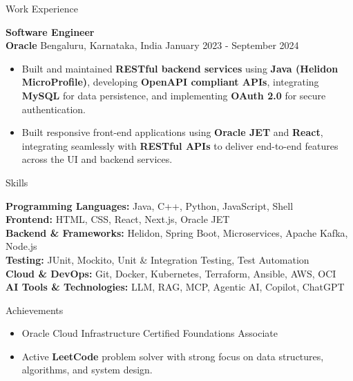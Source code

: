 \documentclass{resume}
\begin{document}
\begin{rSection}{Work Experience}
\vspace{6pt}

\textbf{Software Engineer} \\
\textbf{Oracle} \textbar{} Bengaluru, Karnataka, India \hspace*{\fill} January 2023 - September 2024
\vspace{-2pt}
\begin{itemize}
    \item Built and maintained \textbf{RESTful backend services} using \textbf{Java (Helidon MicroProfile)}, developing \textbf{OpenAPI compliant APIs}, integrating \textbf{MySQL} for data persistence, and implementing \textbf{OAuth 2.0} for secure authentication.
    \item Built responsive front-end applications using \textbf{Oracle JET} and \textbf{React}, integrating seamlessly with \textbf{RESTful APIs} to deliver end-to-end features across the UI and backend services.
\end{itemize}

\end{rSection}

\begin{rSection}{Skills}

\vspace{-2pt}
\textbf{Programming Languages:} Java, C++, Python, JavaScript, Shell \\
\textbf{Frontend:} HTML, CSS, React, Next.js, Oracle JET \\
\textbf{Backend \& Frameworks:} Helidon, Spring Boot, Microservices, Apache Kafka, Node.js \\
\textbf{Testing:} JUnit, Mockito, Unit \& Integration Testing, Test Automation \\
\textbf{Cloud \& DevOps:} Git, Docker, Kubernetes, Terraform, Ansible, AWS, OCI \\
\textbf{AI Tools \& Technologies:} LLM, RAG, MCP, Agentic AI, Copilot, ChatGPT

\end{rSection}

\begin{rSection}{Achievements}

\begin{itemize}
    \item Oracle Cloud Infrastructure Certified Foundations Associate
    \item Active \textbf{LeetCode} problem solver with strong focus on data structures, algorithms, and system design.
\end{itemize}

\end{rSection}
\end{document}
